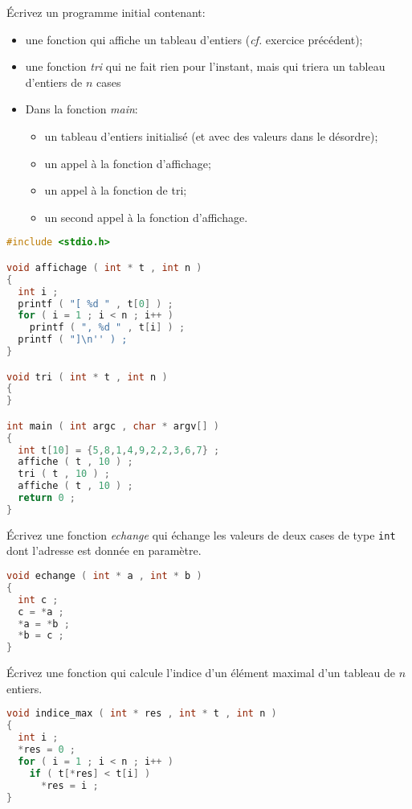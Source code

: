 \question Écrivez un programme initial contenant:
\begin{itemize}
\item une fonction qui affiche un tableau d'entiers (\textit{cf.} exercice précédent);
\item une fonction \emph{tri} qui ne fait rien pour l'instant, mais qui triera un tableau d'entiers de \(n\) cases
\item Dans la fonction \emph{main}:
  \begin{itemize}
  \item un tableau d'entiers initialisé (et avec des valeurs dans le
    désordre);
  \item un appel à la fonction d'affichage;
  \item un appel à la fonction de tri;
  \item un second appel à la fonction d'affichage.
  \end{itemize}
\end{itemize}

\begin{solution}
  \begin{lstlisting}[language=C]
#include <stdio.h>

void affichage ( int * t , int n )
{
  int i ;
  printf ( "[ %d " , t[0] ) ;
  for ( i = 1 ; i < n ; i++ )
    printf ( ", %d " , t[i] ) ;
  printf ( "]\n'' ) ;
}

void tri ( int * t , int n )
{
}

int main ( int argc , char * argv[] )
{
  int t[10] = {5,8,1,4,9,2,2,3,6,7} ;
  affiche ( t , 10 ) ;
  tri ( t , 10 ) ;
  affiche ( t , 10 ) ;
  return 0 ;
}
  \end{lstlisting}
\end{solution}

\question Écrivez une fonction \emph{echange} qui échange les valeurs
de deux cases de type \texttt{int} dont l'adresse est donnée en paramètre.

\begin{solution}
  \begin{lstlisting}[language=C]
void echange ( int * a , int * b )
{
  int c ;
  c = *a ;
  *a = *b ;
  *b = c ;
}
  \end{lstlisting}
\end{solution}

\question Écrivez une fonction qui calcule l'indice d'un élément
maximal d'un tableau de \(n\) entiers.

\begin{solution}
  \begin{lstlisting}[language=C]
void indice_max ( int * res , int * t , int n )
{
  int i ;
  *res = 0 ;
  for ( i = 1 ; i < n ; i++ )
    if ( t[*res] < t[i] )
      *res = i ;
}
  \end{lstlisting}
\end{solution}

